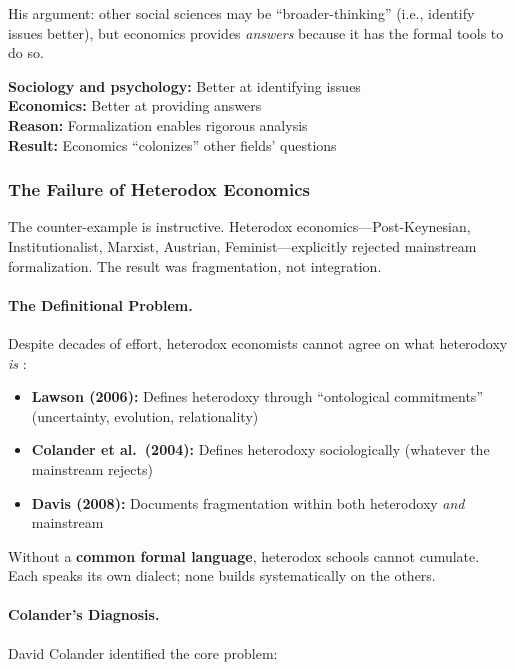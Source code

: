 His argument: other social sciences may be ``broader-thinking'' (i.e., identify
issues better), but economics provides \textit{answers} because it has the
formal tools to do so.

\begin{tcolorbox}[colback=gray!5!white, colframe=gray!75!black,
    title=\textbf{The Lazear Diagnosis}]
\textbf{Sociology and psychology:} Better at identifying issues \\
\textbf{Economics:} Better at providing answers \\
\textbf{Reason:} Formalization enables rigorous analysis \\
\textbf{Result:} Economics ``colonizes'' other fields' questions
\end{tcolorbox}

\subsubsection{The Failure of Heterodox Economics}

The counter-example is instructive. Heterodox economics---Post-Keynesian,
Institutionalist, Marxist, Austrian, Feminist---explicitly rejected mainstream
formalization. The result was fragmentation, not integration.

\paragraph{The Definitional Problem.}
Despite decades of effort, heterodox economists cannot agree on what heterodoxy
\textit{is} \citep{lawson2006nature,davis2008heterodox}:

\begin{itemize}[nosep]
    \item \textbf{Lawson (2006):} Defines heterodoxy through ``ontological commitments''
        (uncertainty, evolution, relationality)
    \item \textbf{Colander et al.\ (2004):} Defines heterodoxy sociologically
        (whatever the mainstream rejects)
    \item \textbf{Davis (2008):} Documents fragmentation within both heterodoxy
        \textit{and} mainstream
\end{itemize}

Without a \textbf{common formal language}, heterodox schools cannot cumulate.
Each speaks its own dialect; none builds systematically on the others.

\paragraph{Colander's Diagnosis.}
David Colander \citep{colander2004changing} identified the core problem:

